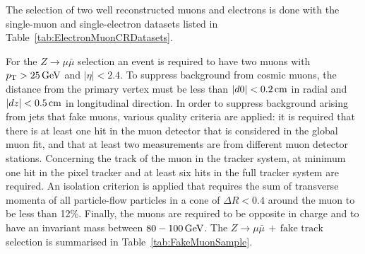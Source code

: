The selection of two well reconstructed muons and electrons is done with the single-muon and single-electron datasets listed in Table~\ref{tab:ElectronMuonCRDatasets}.
\renewcommand{\arraystretch}{1.5}
\begin{table}[!h]
\centering
\caption{Datasets used for the determination of the fake rate.}
\label{tab:ElectronMuonCRDatasets}
\end{table}  
For the $Z\rightarrow\mu\bar{\mu}$ selection an event is required to have two muons with $p_{\text{T}}>25\,\text{Ge}\kern-0.06667em\text{V}$ and $|\eta|<2.4$.
To suppress background from cosmic muons, the distance from the primary vertex must be less than $|d0|<0.2\,\text{cm}$ in radial and $|dz|<0.5\,\text{cm}$ in longitudinal direction.
In order to suppress background arising from jets that fake muons, various quality criteria are applied: it is required that there is at least one hit in the muon detector that is considered in the global muon fit, 
and that at least two measurements are from different muon detector stations.
Concerning the track of the muon in the tracker system, at minimum one hit in the pixel tracker and at least six hits in the full tracker system are required. 
An isolation criterion is applied that requires the sum of transverse momenta of all particle-flow particles in a cone of $\Delta R<0.4$ around the muon  to be less than 12\%.
Finally, the muons are required to be opposite in charge and to have an invariant mass between $80-100\,\text{Ge}\kern-0.06667em\text{V}$.
The $Z\rightarrow\mu\bar{\mu}\,+\,\text{fake track}$ selection is summarised in Table~\ref{tab:FakeMuonSample}.
